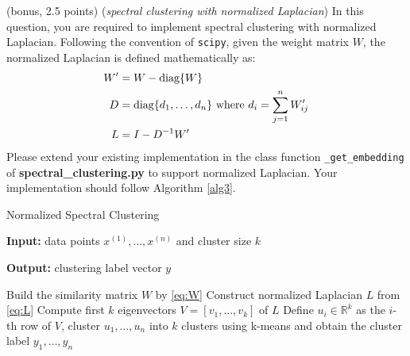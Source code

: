 \documentclass[a4paper, 12pt]{exam}
\begin{document}
\begin{questions}
		\question (bonus, 2.5 points)
	    (\emph{spectral clustering with normalized Laplacian})
	    In this question, you are required to implement spectral clustering with
	    normalized Laplacian.
	    Following the convention of \texttt{scipy}, given the weight matrix $W$, the normalized Laplacian is defined mathematically as:
	    \begin{align}
	        W' &= W - \textrm{diag}\{W\} \notag \\
	        D &= \textrm{diag}\{d_1, \dots, d_n\} \textrm{ where } d_i = \sum_{j=1}^n W'_{ij} \notag\\
	        L &= I - D^{-1} W'\label{eq:L}
	    \end{align}
	    Please extend your
	    existing implementation in the class function \texttt{\_get\_embedding} of \textbf{spectral\_clustering.py} to support normalized Laplacian. Your implementation should follow Algorithm \ref{alg3}.
\begin{algorithm}
\caption{Normalized Spectral Clustering\label{alg3}} %
\hspace*{0.02in} {\bf Input:} %
data points $x^{(1)}, \dots, x^{(n)}$ and cluster size $k$

\hspace*{0.02in}
{\bf Output: } clustering label vector $y$
\begin{algorithmic}[1]
\State Build the similarity matrix $W$ by \eqref{eq:W}
\State Construct normalized Laplacian $L$ from \eqref{eq:L}
\State Compute first $k$ eigenvectors $V=[v_1, \dots, v_k]$ of $L$
\State Define $u_i \in \mathbb{R}^k$ as the $i$-th row of $V$,
cluster $u_1, \dots, u_n$ into $k$ clusters using k-means and obtain
the cluster label $y_1, \dots, y_n$
\end{algorithmic}
\end{algorithm}	
	\end{questions}
	
\end{document}
